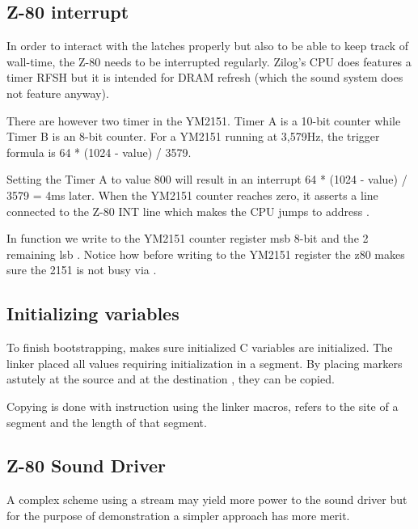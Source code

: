 \subsection{Z-80 interrupt}
In order to interact with the latches properly but also to be able to keep track of wall-time, the Z-80 needs to be interrupted regularly. Zilog's CPU does features a timer RFSH but it is intended for DRAM refresh (which the sound system does not feature anyway).

There are however two timer in the YM2151. Timer A is a 10-bit counter while Timer B is an 8-bit counter. For a YM2151 running at 3,579Hz, the trigger formula is 64 * (1024 - value) / 3579.

Setting the Timer A to value 800 will result in an interrupt 64 * (1024 - value) / 3579 = 4ms later. When the YM2151 counter reaches zero, it asserts a line connected to the Z-80 INT line which makes the CPU jumps to address .



In function  we write to the YM2151 counter register msb 8-bit  and the 2 remaining lsb . Notice how before writing to the YM2151 register the z80 makes sure the 2151 is not busy via .





\subsection{Initializing variables}
To finish bootstrapping,  makes sure initialized C variables are initialized. The linker placed all values requiring initialization in a  segment. By placing markers astutely at the source  and at the destination , they can be copied.



Copying is done with  instruction using the linker macros,  refers to the site of a segment and  the length of that segment.


 



\subsection{Z-80 Sound Driver}
A complex scheme using a stream may yield more power to the sound driver but for the purpose of demonstration a simpler approach has more merit.

